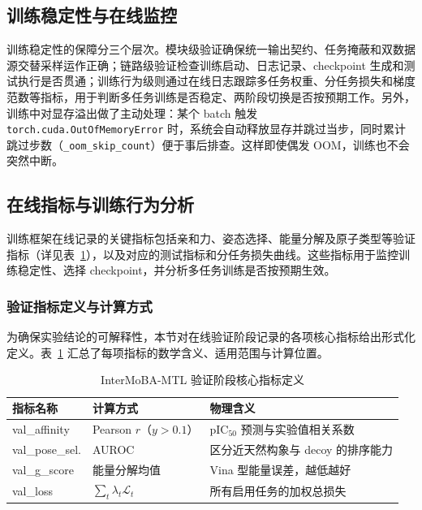 \subsection{训练稳定性与在线监控}

训练稳定性的保障分三个层次。模块级验证确保统一输出契约、任务掩蔽和双数据源交替采样运作正确；链路级验证检查训练启动、日志记录、checkpoint 生成和测试执行是否贯通；训练行为级则通过在线日志跟踪多任务权重、分任务损失和梯度范数等指标，用于判断多任务训练是否稳定、两阶段切换是否按预期工作。另外，训练中对显存溢出做了主动处理：某个 batch 触发 \texttt{torch.cuda.OutOfMemoryError} 时，系统会自动释放显存并跳过当步，同时累计跳过步数（\texttt{\_oom\_skip\_count}）便于事后排查。这样即使偶发 OOM，训练也不会突然中断。

\subsection{在线指标与训练行为分析}

训练框架在线记录的关键指标包括亲和力、姿态选择、能量分解及原子类型等验证指标（详见表~\ref{T.val_metric_definitions}），以及对应的测试指标和分任务损失曲线。这些指标用于监控训练稳定性、选择 checkpoint，并分析多任务训练是否按预期生效。

\subsubsection{验证指标定义与计算方式}

为确保实验结论的可解释性，本节对在线验证阶段记录的各项核心指标给出形式化定义。表~\ref{T.val_metric_definitions} 汇总了每项指标的数学含义、适用范围与计算位置。

\begin{table}[htb]
  \centering
  \caption{InterMoBA-MTL 验证阶段核心指标定义}
  \label{T.val_metric_definitions}
  \footnotesize
  \setlength{\tabcolsep}{4pt}
  \renewcommand{\arraystretch}{1.1}
  \begin{tabular}{p{2.8cm}p{2.8cm}p{5.2cm}}
  \hline
  指标名称 & 计算方式 & 物理含义 \\
  \hline
  val\_affinity & Pearson $r$（$y{>}0.1$） & pIC$_{50}$ 预测与实验值相关系数 \\
  val\_pose\_sel. & AUROC & 区分近天然构象与 decoy 的排序能力 \\
  val\_g\_score & 能量分解均值 & Vina 型能量误差，越低越好 \\
  val\_loss & $\sum_t \lambda_t \mathcal{L}_t$ & 所有启用任务的加权总损失 \\
  \hline
  \end{tabular}
\end{table}

